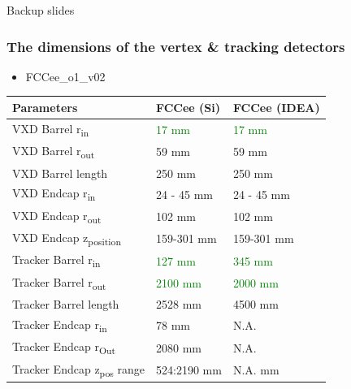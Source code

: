 \documentclass[aspectratio=169, hyperref={colorlinks=true,pdfpagelabels=false,linkcolor=black}, xcolor=dvipsnames,10pt]{beamer}
\begin{document}
\begin{frame}

	\centering
	\Huge{Backup slides}
\end{frame}

\begin{frame}
	\frametitle{The dimensions of the vertex \& tracking detectors}


  \begin{itemize}
	\item FCCee\_o1\_v02
	\end{itemize}

	\begin{tabular}{l|l|l}
	Parameters & FCCee (Si) & FCCee (IDEA) \\ \hline
	VXD Barrel r\textsubscript{in} & \textcolor{Green}{17 mm} & \textcolor{Green}{17 mm} \\
	VXD Barrel r\textsubscript{out} & 59 mm & 59 mm \\
	VXD Barrel length & 250 mm & 250 mm \\
	VXD Endcap r\textsubscript{in} & 24 - 45 mm & 24 - 45 mm \\
	VXD Endcap r\textsubscript{out} & 102 mm & 102 mm \\
	VXD Endcap z\textsubscript{position} & 159-301 mm & 159-301 mm \\
	Tracker Barrel r\textsubscript{in} & \textcolor{Green}{127 mm} & \textcolor{Green}{345 mm} \\
	Tracker Barrel r\textsubscript{out} & \textcolor{Green}{2100 mm} & \textcolor{Green}{2000 mm} \\
	Tracker Barrel length & 2528 mm & 4500 mm \\
	Tracker Endcap r\textsubscript{in} & 78 mm & N.A. \\
	Tracker Endcap r\textsubscript{Out} & 2080 mm & N.A. \\
	Tracker Endcap z\textsubscript{pos} range & 524:2190 mm & N.A. mm \\
	\end{tabular}


\end{frame}

\end{document}
